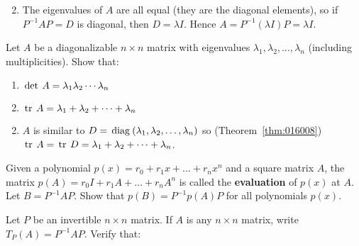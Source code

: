 \begin{multicols}{2}
\begin{ex}
\begin{enumerate}[label={\alph*.}]
\end{enumerate}
\begin{sol}
\begin{enumerate}[label={\alph*.}]
\setcounter{enumi}{1}
\item  The eigenvalues of $A$ are all equal (they are the diagonal elements), so if $P^{-1}AP = D$ is diagonal, then $D = \lambda I$. Hence $A = P^{-1}(\lambda I)P = \lambda I$.

\end{enumerate}
\end{sol}
\end{ex}

\columnbreak 

\begin{ex}
Let $A$ be a diagonalizable $n \times n$ matrix with eigenvalues $\lambda_{1}, \lambda_{2}, \dots, \lambda_{n}$ (including multiplicities). Show that:

\begin{enumerate}[label={\alph*.}]
\item $\thinspace\operatorname{det\medspace} A = \lambda_{1}\lambda_{2}\cdots \lambda_{n}$

\item $\thinspace\operatorname{tr\medspace} A = \lambda_{1} + \lambda_{2} + \cdots + \lambda_{n}$

\end{enumerate}
\begin{sol}
\begin{enumerate}[label={\alph*.}]
\setcounter{enumi}{1}
\item  $A$ is similar to $D = \thinspace\operatorname{diag\medspace}(\lambda_{1}, \lambda_{2}, \dots, \lambda_{n})$ so (Theorem~\ref{thm:016008}) $\thinspace\operatorname{tr\medspace} A = \thinspace\operatorname{tr\medspace} D = \lambda_{1} + \lambda_{2} + \dots + \lambda_{n}$.

\end{enumerate}
\end{sol}
\end{ex}

\begin{ex}
Given a polynomial $p(x) = r_{0} + r_{1}x + \dots + r_{n}x^{n}$ and a square matrix $A$, the matrix $p(A) = r_{0}I + r_{1}A + \dots  + r_{n}A^{n}$ is called the \textbf{evaluation} of $p(x)$ at $A$. Let $B = P^{-1}AP$. Show that $p(B) = P^{-1}p(A)P$ for all polynomials $p(x)$.
\end{ex}

\begin{ex}
	\label{ex:5_5_12}
Let $P$ be an invertible $n \times n$ matrix. If $A$ is any $n \times n$ matrix, write $T_{P}(A) = P^{-1}AP$. Verify that:


\end{ex}
\end{multicols}
